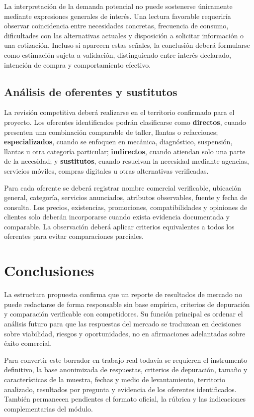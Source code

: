 {La interpretación de la demanda potencial no puede sostenerse únicamente mediante expresiones generales de interés. Una lectura favorable requeriría observar coincidencia entre necesidades concretas, frecuencia de consumo, dificultades con las alternativas actuales y disposición a solicitar información o una cotización. Incluso si aparecen estas señales, la conclusión deberá formularse como estimación sujeta a validación, distinguiendo entre interés declarado, intención de compra y comportamiento efectivo.

\subsection{Análisis de oferentes y sustitutos}

La revisión competitiva deberá realizarse en el territorio confirmado para el proyecto. Los oferentes identificados podrán clasificarse como \textbf{directos}, cuando presenten una combinación comparable de taller, llantas o refacciones; \textbf{especializados}, cuando se enfoquen en mecánica, diagnóstico, suspensión, llantas u otra categoría particular; \textbf{indirectos}, cuando atiendan solo una parte de la necesidad; y \textbf{sustitutos}, cuando resuelvan la necesidad mediante agencias, servicios móviles, compras digitales u otras alternativas verificadas.

Para cada oferente se deberá registrar nombre comercial verificable, ubicación general, categoría, servicios anunciados, atributos observables, fuente y fecha de consulta. Los precios, existencias, promociones, compatibilidades y opiniones de clientes solo deberán incorporarse cuando exista evidencia documentada y comparable. La observación deberá aplicar criterios equivalentes a todos los oferentes para evitar comparaciones parciales.

\section{Conclusiones}

La estructura propuesta confirma que un reporte de resultados de mercado no puede redactarse de forma responsable sin base empírica, criterios de depuración y comparación verificable con competidores. Su función principal es ordenar el análisis futuro para que las respuestas del mercado se traduzcan en decisiones sobre viabilidad, riesgos y oportunidades, no en afirmaciones adelantadas sobre éxito comercial.

Para convertir este borrador en trabajo real todavía se requieren el instrumento definitivo, la base anonimizada de respuestas, criterios de depuración, tamaño y características de la muestra, fechas y medio de levantamiento, territorio analizado, resultados por pregunta y evidencia de los oferentes identificados. También permanecen pendientes el formato oficial, la rúbrica y las indicaciones complementarias del módulo.
}

